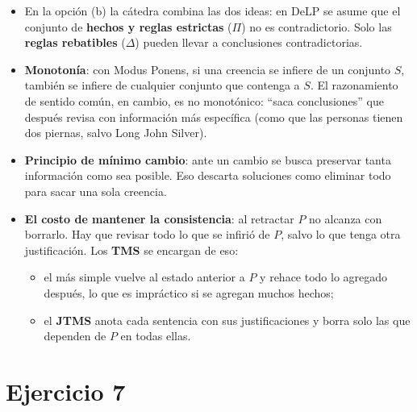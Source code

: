 \documentclass[11pt,a4paper]{article}
\begin{document}
\begin{extras}
\begin{itemize}
  \item En la opción (b) la cátedra combina las dos ideas: en DeLP se asume que el conjunto de \textbf{hechos y reglas estrictas} ($\Pi$) no es contradictorio. Solo las \textbf{reglas rebatibles} ($\Delta$) pueden llevar a conclusiones contradictorias.
  \item \textbf{Monotonía}: con Modus Ponens, si una creencia se infiere de un conjunto $S$, también se infiere de cualquier conjunto que contenga a $S$. El razonamiento de sentido común, en cambio, es no monotónico: ``saca conclusiones'' que después revisa con información más específica (como que las personas tienen dos piernas, salvo Long John Silver).
  \item \textbf{Principio de mínimo cambio}: ante un cambio se busca preservar tanta información como sea posible. Eso descarta soluciones como eliminar todo para sacar una sola creencia.
  \item \textbf{El costo de mantener la consistencia}: al retractar $P$ no alcanza con borrarlo. Hay que revisar todo lo que se infirió de $P$, salvo lo que tenga otra justificación. Los \textbf{TMS} se encargan de eso:
  \begin{itemize}
    \item el más simple vuelve al estado anterior a $P$ y rehace todo lo agregado después, lo que es impráctico si se agregan muchos hechos;
    \item el \textbf{JTMS} anota cada sentencia con sus justificaciones y borra solo las que dependen de $P$ en todas ellas.
  \end{itemize}
\end{itemize}
\end{extras}

\section{Ejercicio 7}
\end{document}
